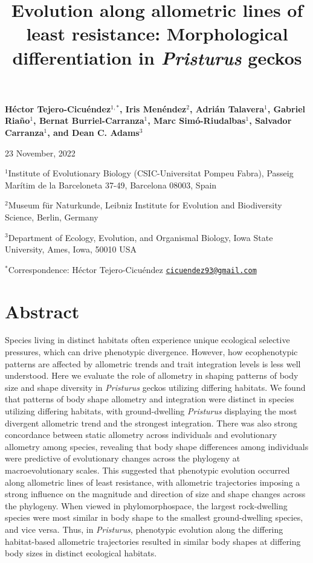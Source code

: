 \documentclass[
  11pt,
]{article}
\title{Evolution along allometric lines of least resistance:
Morphological differentiation in \emph{Pristurus} geckos}
\author{}
\date{\vspace{-2.5em}}
\begin{document}
\maketitle

\begin{center}
\textbf{H{\'{e}}ctor Tejero-Cicu{\'{e}}ndez$^{1,*}$,  Iris Men{\'{e}}ndez$^{2}$, Adri{\'{a}}n Talavera$^{1}$, Gabriel Riaño$^{1}$, Bernat Burriel-Carranza$^{1}$, Marc Sim{\'{o}}-Riudalbas$^{1}$, Salvador Carranza$^{1}$, and Dean C. Adams$^{3}$}
\end{center}

\begin{center}23 November, 2022\end{center}

\(^{1}\)Institute of Evolutionary Biology (CSIC-Universitat Pompeu
Fabra), Passeig Marítim de la Barceloneta 37-49, Barcelona 08003, Spain

\(^{2}\)Museum für Naturkunde, Leibniz Institute for Evolution and
Biodiversity Science, Berlin, Germany

\(^{3}\)Department of Ecology, Evolution, and Organismal Biology, Iowa
State University, Ames, Iowa, 50010 USA

\(^{*}\)Correspondence: Héctor Tejero-Cicuéndez
\href{mailto:cicuendez93@gmail.com}{\nolinkurl{cicuendez93@gmail.com}}

\newpage

\hypertarget{abstract}{%
\section{Abstract}\label{abstract}}

Species living in distinct habitats often experience unique ecological
selective pressures, which can drive phenotypic divergence. However, how
ecophenotypic patterns are affected by allometric trends and trait
integration levels is less well understood. Here we evaluate the role of
allometry in shaping patterns of body size and shape diversity in
\emph{Pristurus} geckos utilizing differing habitats. We found that
patterns of body shape allometry and integration were distinct in
species utilizing differing habitats, with ground-dwelling
\emph{Pristurus} displaying the most divergent allometric trend and the
strongest integration. There was also strong concordance between static
allometry across individuals and evolutionary allometry among species,
revealing that body shape differences among individuals were predictive
of evolutionary changes across the phylogeny at macroevolutionary
scales. This suggested that phenotypic evolution occurred along
allometric lines of least resistance, with allometric trajectories
imposing a strong influence on the magnitude and direction of size and
shape changes across the phylogeny. When viewed in phylomorphospace, the
largest rock-dwelling species were most similar in body shape to the
smallest ground-dwelling species, and vice versa. Thus, in
\emph{Pristurus}, phenotypic evolution along the differing habitat-based
allometric trajectories resulted in similar body shapes at differing
body sizes in distinct ecological habitats.
\end{document}
